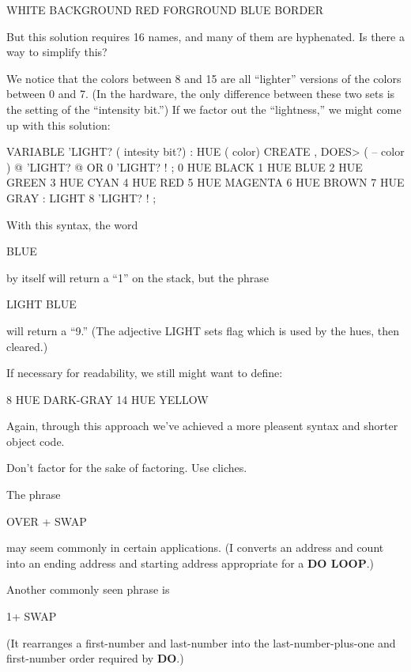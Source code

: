 \begin{Code}
WHITE BACKGROUND  RED FORGROUND  BLUE BORDER
\end{Code}
But this solution requires 16 names, and many of them are hyphenated. Is there a way to simplify this?

We notice that the colors between 8 and 15 are all ``lighter'' versions of the colors between 0 and 7. (In the hardware, the only difference between these two sets is the setting of the ``intensity bit.'') If we factor out the ``lightness,'' we might come up with this solution:

\begin{Code}
VARIABLE 'LIGHT?  ( intesity bit?)
: HUE  ( color)  CREATE ,
   DOES>  ( -- color )  @  'LIGHT? @  OR  0 'LIGHT? ! ;
 0 HUE BLACK         1 HUE BLUE           2 HUE GREEN
 3 HUE CYAN          4 HUE RED            5 HUE MAGENTA
 6 HUE BROWN         7 HUE GRAY
: LIGHT   8 'LIGHT? ! ;
\end{Code}

\noindent     
With this syntax, the word

\begin{Code}
BLUE
\end{Code}
by itself will return a ``1'' on the stack, but the phrase

\begin{Code}
LIGHT BLUE
\end{Code}
will return a ``9.'' (The adjective LIGHT sets flag which is used by the hues, then cleared.)

If necessary for readability, we still might want to define:

\begin{Code}
8 HUE DARK-GRAY
14 HUE YELLOW
\end{Code}
Again, through this approach we've achieved a more pleasent syntax and shorter object code.

\begin{tip}
Don't factor for the sake of factoring. Use cliches.
\end{tip}
The phrase

\begin{Code}
OVER + SWAP
\end{Code}
may seem commonly in certain applications. (I converts an address and count into an ending address and starting address appropriate for a \textbf{DO LOOP}.)

Another commonly seen phrase is

\begin{Code}
1+ SWAP
\end{Code}
(It rearranges a first-number and last-number into the last-number-plus-one and first-number order required by \textbf{DO}.)

